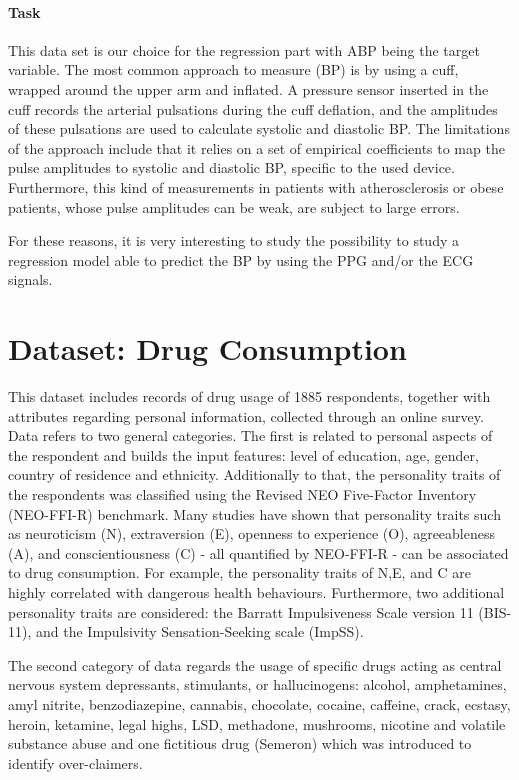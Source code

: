 \documentclass{article}
\begin{document}
\paragraph{Task}
\noindent This data set is our choice for the regression part with ABP being the target variable.
The most common approach to measure (BP) is by using a cuff, wrapped around the upper arm and inflated. A pressure sensor inserted in the cuff records the arterial pulsations during the cuff deflation, and the amplitudes of these pulsations are used to calculate systolic and diastolic BP. The limitations of the approach include that it relies on a set of empirical coefficients to map the pulse amplitudes to systolic and diastolic BP, specific to the used device. Furthermore, this kind of measurements in patients with atherosclerosis or obese patients, whose pulse amplitudes can be weak, are subject to large errors.

For these reasons, it is very interesting to study the possibility to study a regression model able to predict the BP by using the PPG and/or the ECG signals.





\section{Dataset: Drug Consumption}
This dataset \cite{fehrman2017factor} includes records of drug usage of 1885 respondents, together with attributes regarding personal information, collected through an online survey. Data refers to two general categories.
The first is related to personal aspects of the respondent and builds the input features: level of education, age, gender, country of residence and ethnicity. Additionally to that, the personality traits of the respondents was classified using the Revised NEO Five-Factor Inventory (NEO-FFI-R) benchmark. Many studies have shown that personality traits such as neuroticism (N), extraversion (E), openness to experience (O), agreeableness (A), and conscientiousness (C) - all quantified by NEO-FFI-R -  can be associated to drug consumption\cite{Roncero2014NeuroticismAW}\cite{Vollrath2002WhoTH}\cite{Flory2002TheRA}. For example, the personality traits of N,E, and C are highly correlated with dangerous health behaviours. Furthermore, two additional personality traits are considered: the Barratt Impulsiveness Scale version 11 (BIS-11), and the Impulsivity Sensation-Seeking scale (ImpSS).

The second category of data regards the usage of specific drugs acting as central nervous system depressants, stimulants, or hallucinogens: alcohol, amphetamines, amyl nitrite, benzodiazepine, cannabis, chocolate, cocaine, caffeine, crack, ecstasy, heroin, ketamine, legal highs, LSD, methadone, mushrooms, nicotine and volatile substance abuse and one fictitious drug (Semeron) which was introduced to identify over-claimers.
\end{document}
